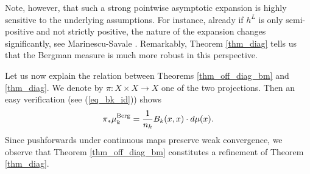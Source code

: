 \documentclass[12pt]{article}
\numberwithin{equation}{section}
\theoremstyle{theorem}
\theoremstyle{definition}
\theoremstyle{remark}
\begin{document}
	Note, however, that such a strong pointwise asymptotic expansion is highly sensitive to the underlying assumptions.  
	For instance, already if $h^L$ is only semi-positive and not strictly positive, the nature of the expansion changes significantly, see Marinescu-Savale \cite{MarinSaval}.
	Remarkably, Theorem \ref{thm_diag} tells us that the Bergman measure is much more robust in this perspective.
	\par 
	Let us now explain the relation between Theorems \ref{thm_off_diag_bm} and \ref{thm_diag}.
	We denote by $\pi: X \times X \to X$ one of the two projections. 
	Then an easy verification (see (\ref{eq_bk_id})) shows
	\begin{equation}\label{eq_push_forw}
		\pi_* \mu_k^{\rm{Berg}}
		=
		\frac{1}{n_k} B_k(x, x) \cdot d \mu(x).
	\end{equation}
	Since pushforwards under continuous maps preserve weak convergence, we observe that Theorem \ref{thm_off_diag_bm} constitutes a refinement of Theorem \ref{thm_diag}.
	\par 
\end{document}
